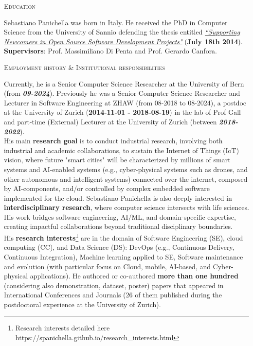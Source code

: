 \documentclass[11pt]{article}
\begin{document}
\vspace{2.5mm}
\textsc{Education}
\vspace{1.5mm}

Sebastiano Panichella was born in Italy.
He received the PhD in Computer Science from the University of Sannio 
 defending the thesis entitled  \href{http://dx.doi.org/10.1109/ICSM.2015.7332519}{\textit{``Supporting Newcomers in Open Source Software Development Projects"}} (\textbf{July 18th 2014}). \textbf{Supervisors}: Prof. Massimiliano  Di Penta and Prof. Gerardo Canfora.

\vspace{2.5mm}
\textsc{Employment history \& Institutional responsibilities}
\vspace{1.5mm}


Currently, he is a Senior Computer Science Researcher at the University of Bern (from \textit{\textbf{09-2024}}). Previously he was a Senior Computer Science Researcher and Lecturer in Software Engineering at ZHAW (from 08-2018 to 08-2024), a postdoc at the University of Zurich (\textbf{2014-11-01 - 2018-08-19}) in the lab of Prof Gall and part-time (External) Lecturer at the University of Zurich (between \textit{\textbf{2018-2022}}). \\
His main \textbf{research goal} is to conduct industrial research, involving both industrial and academic collaborations, to sustain the Internet of Things (IoT) vision, where future "smart cities" will be characterized by millions of smart systems and AI-enabled systems (e.g., cyber-physical systems such as drones, and other autonomous and intelligent systems) connected over the internet, composed by AI-components, and/or controlled by complex embedded software implemented for the cloud.
Sebastiano Panichella is also deeply interested in \textbf{interdisciplinary research}, where computer science intersects with life sciences. His work bridges software engineering, AI/ML, and domain-specific expertise, creating impactful collaborations beyond traditional disciplinary boundaries.
\\
His  \textbf{research interests}\footnote{ Research interests detailed here https://spanichella.github.io/research\_interests.html} are in the domain of Software Engineering (SE), cloud computing (CC), and Data Science (DS): DevOps (e.g., Continuous Delivery, Continuous Integration), Machine learning applied to SE, Software maintenance and evolution (with particular focus on Cloud, mobile, AI-based, and Cyber-physical applications). 
He authored or co-authored \textbf{more than one hundred} (considering also demonstration, dataset, poster) papers that appeared in International Conferences and Journals (26 of them published during the postdoctoral experience at the University of Zurich).
 
\end{document}
